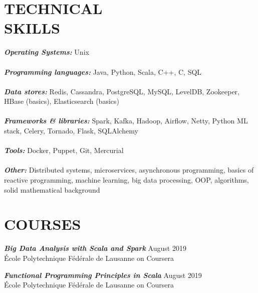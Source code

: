 \documentclass[margin, 10pt]{res} %
\begin{document}
\begin{resume}

\section{TECHNICAL \\ SKILLS} 

{\sl \bf Operating Systems:} Unix \\ \\
{\sl \bf Programming languages:}
Java, Python, Scala, C++, C, SQL \\ \\ 
{\sl \bf Data stores:} Redis, Cassandra, PostgreSQL, MySQL, LevelDB, Zookeeper, HBase (basics), Elasticsearch (basics) \\ \\
{\sl \bf Frameworks \& libraries:} Spark, Kafka, Hadoop, Airflow, Netty, Python ML stack, Celery, Tornado, Flask, SQLAlchemy \\ \\
{\sl \bf Tools:} Docker, Puppet, Git, Mercurial \\ \\
{\sl \bf Other:} Distributed systems, microservices, asynchronous programming, basics of reactive programming, machine learning, big data processing, OOP, algorithms, solid mathematical background

 
\section{COURSES}

{\sl \bf Big Data Analysis with Scala and Spark} \hfill  August 2019 \\
École Polytechnique Fédérale de Lausanne on Coursera 

{\sl \bf Functional Programming Principles in Scala} \hfill  August 2019 \\
École Polytechnique Fédérale de Lausanne on Coursera 



\end{resume}
\end{document}
